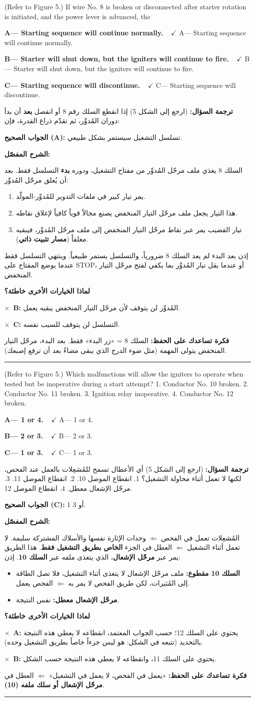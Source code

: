 \documentclass[11pt,a4paper]{article}
\newcommand{\en}[1]{\textenglish{#1}}
\newcommand{\correctletter}{}
\newcommand{\opt}[2]{%
  \ifdefstring{\correctletter}{#1}%
    {\textcolor{ansgreen}{\textbf{#1— #2\ \ $\checkmark$}}}%
    {#1— #2}\par}
\newcommand{\Q}[6]{%
  \renewcommand{\correctletter}{#6}%
  \par\bigskip
  \phantomsection\label{q#1}%
  \begin{tcolorbox}[enhanced,breakable,colback=qback,colframe=qframe,
      arc=2mm,boxrule=0.8pt,fonttitle=\bfseries,
      title={\en{Question #1}}]
    \begin{english}
      #2\par\smallskip
      \opt{A}{#3}\opt{B}{#4}\opt{C}{#5}
    \end{english}
  \end{tcolorbox}}
\newcommand{\tr}[1]{\textbf{\textcolor{qframe}{ترجمة السؤال:}} #1\par}
\newcommand{\ans}[2]{%
  \begin{tcolorbox}[colback=ansback,colframe=ansgreen,boxrule=0.6pt,arc=1.5mm,
      left=4pt,right=4pt,top=2pt,bottom=2pt]
    \textbf{\textcolor{ansgreen}{الجواب الصحيح (\en{#1}):}} #2
  \end{tcolorbox}}
\newcommand{\sharh}[1]{\textbf{\textcolor{conceptc}{الشرح المفصّل:}}\par #1\par}
\newcommand{\nohead}{\textbf{\textcolor{wrongc}{لماذا الخيارات الأخرى خاطئة؟}}\par}
\newcommand{\no}[2]{\hspace*{1em}\textcolor{wrongc}{$\times$}\ \textbf{\en{#1}:} #2\par}
\newcommand{\tip}[1]{%
  \begin{tcolorbox}[colback=tipback,colframe=tipframe,boxrule=0.5pt,arc=1.5mm,
      left=4pt,right=4pt,top=2pt,bottom=2pt]
    \textbf{فكرة تساعدك على الحفظ:} #1
  \end{tcolorbox}}
\newcommand{\qsep}{\par\medskip\noindent\textcolor{qframe!40}{\rule{\linewidth}{0.4pt}}\par}
\begin{document}
\Q{8617}{(Refer to Figure 5.) If wire No. 8 is broken or disconnected after starter rotation is initiated, and the power lever is advanced, the}
{Starting sequence will continue normally.}
{Starter will shut down, but the igniters will continue to fire.}
{Starting sequence will discontinue.}{A}
\tr{(ارجع إلى الشكل 5) إذا انقطع السلك رقم 8 أو انفصل \textbf{بعد} أن بدأ دوران المُدوِّر، ثم تقدّم ذراع القدرة، فإن:}
\ans{A}{تسلسل التشغيل سيستمر بشكل طبيعي.}
\sharh{السلك 8 يغذي ملف مرحّل المُدوِّر من مفتاح التشغيل، ودوره \textbf{بدء} التسلسل فقط. بعد أن يُغلق مرحّل المُدوِّر:
\begin{enumerate}[label=\arabic*.]
  \item يمر تيار كبير في ملفات التدوير للمُدوِّر-المولّد.
  \item هذا التيار يجعل ملف مرحّل التيار المنخفض يصنع مجالاً قوياً كافياً لإغلاق نقاطه.
  \item تيار القضيب يمر عبر نقاط مرحّل التيار المنخفض إلى ملف مرحّل المُدوِّر، فيبقيه مغلقاً (\textbf{مسار تثبيت ذاتي}).
\end{enumerate}
إذن بعد البدء لم يعد السلك 8 ضرورياً، والتسلسل يستمر طبيعياً. وينتهي التسلسل فقط عندما يوضع المفتاح على \en{STOP}، أو عندما يقل تيار المُدوِّر بما يكفي لفتح مرحّل التيار المنخفض.}
\nohead
\no{B}{المُدوِّر لن يتوقف لأن مرحّل التيار المنخفض يبقيه يعمل.}
\no{C}{التسلسل لن يتوقف للسبب نفسه.}
\tip{السلك 8 = «زر البدء» فقط. بعد البدء، مرحّل التيار المنخفض يتولى المهمة (مثل ضوء الدرج الذي يبقى مضاءً بعد أن ترفع إصبعك).}
\qsep

\Q{8621}{(Refer to Figure 5.) Which malfunctions will allow the igniters to operate when tested but be inoperative during a start attempt? 1. Conductor No. 10 broken. 2. Conductor No. 11 broken. 3. Ignition relay inoperative. 4. Conductor No. 12 broken.}
{1 or 4.}
{2 or 3.}
{1 or 3.}{C}
\tr{(ارجع إلى الشكل 5) أي الأعطال تسمح للمُشعِلات بالعمل عند الفحص، لكنها لا تعمل أثناء محاولة التشغيل؟ 1. انقطاع الموصل 10. 2. انقطاع الموصل 11. 3. مرحّل الإشعال معطل. 4. انقطاع الموصل 12.}
\ans{C}{1 أو 3.}
\sharh{المُشعِلات تعمل في الفحص $\Leftarrow$ وحدات الإثارة نفسها والأسلاك المشتركة سليمة. لا تعمل أثناء التشغيل $\Leftarrow$ العطل في الجزء \textbf{الخاص بطريق التشغيل فقط}. هذا الطريق يمر عبر \textbf{مرحّل الإشعال}، الذي يتغذى ملفه عبر \textbf{السلك 10}. إذن:
\begin{itemize}
  \item \textbf{السلك 10 مقطوع:} ملف مرحّل الإشعال لا يتغذى أثناء التشغيل، فلا تصل الطاقة إلى المُثيرات، لكن طريق الفحص لا يمر به $\Leftarrow$ الفحص يعمل.
  \item \textbf{مرحّل الإشعال معطل:} نفس النتيجة.
\end{itemize}}
\nohead
\no{A}{يحتوي على السلك 12؛ حسب الجواب المعتمد، انقطاعه لا يعطي هذه النتيجة بالتحديد (تتبعه في الشكل: هو ليس جزءاً خاصاً بطريق التشغيل وحده).}
\no{B}{يحتوي على السلك 11، وانقطاعه لا يعطي هذه النتيجة حسب الشكل.}
\tip{«يعمل في الفحص، لا يعمل في التشغيل» $\Leftarrow$ العطل في \textbf{مرحّل الإشعال أو سلك ملفه (10)}.}
\qsep
\end{document}
